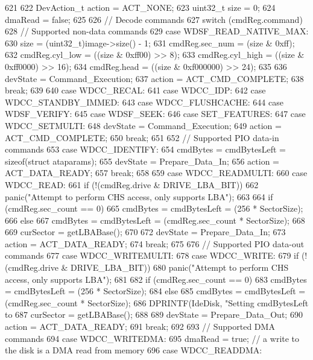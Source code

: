 \begin{DoxyCode}
621 {
622     DevAction_t action = ACT_NONE;
623     uint32_t size = 0;
624     dmaRead = false;
625 
626     // Decode commands
627     switch (cmdReg.command) {
628         // Supported non-data commands
629       case WDSF_READ_NATIVE_MAX:
630         size = (uint32_t)image->size() - 1;
631         cmdReg.sec_num = (size & 0xff);
632         cmdReg.cyl_low = ((size & 0xff00) >> 8);
633         cmdReg.cyl_high = ((size & 0xff0000) >> 16);
634         cmdReg.head = ((size & 0xf000000) >> 24);
635 
636         devState = Command_Execution;
637         action = ACT_CMD_COMPLETE;
638         break;
639 
640       case WDCC_RECAL:
641       case WDCC_IDP:
642       case WDCC_STANDBY_IMMED:
643       case WDCC_FLUSHCACHE:
644       case WDSF_VERIFY:
645       case WDSF_SEEK:
646       case SET_FEATURES:
647       case WDCC_SETMULTI:
648         devState = Command_Execution;
649         action = ACT_CMD_COMPLETE;
650         break;
651 
652         // Supported PIO data-in commands
653       case WDCC_IDENTIFY:
654         cmdBytes = cmdBytesLeft = sizeof(struct ataparams);
655         devState = Prepare_Data_In;
656         action = ACT_DATA_READY;
657         break;
658 
659       case WDCC_READMULTI:
660       case WDCC_READ:
661         if (!(cmdReg.drive & DRIVE_LBA_BIT))
662             panic("Attempt to perform CHS access, only supports LBA\n");
663 
664         if (cmdReg.sec_count == 0)
665             cmdBytes = cmdBytesLeft = (256 * SectorSize);
666         else
667             cmdBytes = cmdBytesLeft = (cmdReg.sec_count * SectorSize);
668 
669         curSector = getLBABase();
670 
672         devState = Prepare_Data_In;
673         action = ACT_DATA_READY;
674         break;
675 
676         // Supported PIO data-out commands
677       case WDCC_WRITEMULTI:
678       case WDCC_WRITE:
679         if (!(cmdReg.drive & DRIVE_LBA_BIT))
680             panic("Attempt to perform CHS access, only supports LBA\n");
681 
682         if (cmdReg.sec_count == 0)
683             cmdBytes = cmdBytesLeft = (256 * SectorSize);
684         else
685             cmdBytes = cmdBytesLeft = (cmdReg.sec_count * SectorSize);
686         DPRINTF(IdeDisk, "Setting cmdBytesLeft to %
687         curSector = getLBABase();
688 
689         devState = Prepare_Data_Out;
690         action = ACT_DATA_READY;
691         break;
692 
693         // Supported DMA commands
694       case WDCC_WRITEDMA:
695         dmaRead = true;  // a write to the disk is a DMA read from memory
696       case WDCC_READDMA:
}}
\end{DoxyCode}
